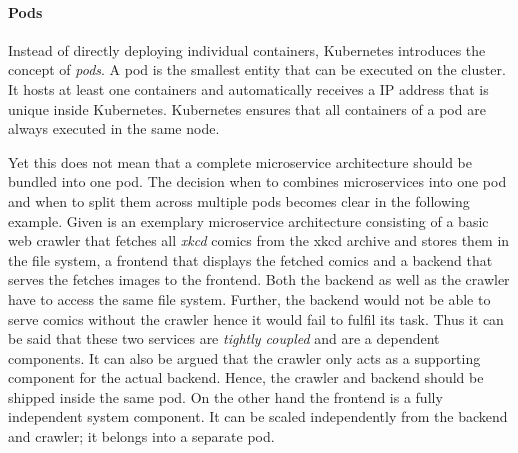 \paragraph{Pods}%
\label{par:Pods}
Instead of directly deploying individual containers, Kubernetes introduces the
concept of \textit{pods}. A pod is the smallest entity that can be executed on
the cluster. It hosts at least one containers and automatically receives a
\ac{IP} address that is unique inside Kubernetes. Kubernetes ensures that all
containers of a pod are always executed in the same node.

Yet this does not mean that a complete microservice architecture should be
bundled into one pod.  The decision when to combines microservices into one pod
and when to split them across multiple pods becomes clear in the following
example. Given is an exemplary microservice architecture consisting of a basic
web crawler that fetches all \textit{xkcd} comics from the xkcd archive and
stores them in the file system, a frontend that displays the fetched comics and
a backend that serves the fetches images to the frontend. Both the backend as
well as the crawler have to access the same file system. Further, the backend
would not be able to serve comics without the crawler hence it would fail to
fulfil its task. Thus it can be said that these two services are
\textit{tightly coupled} and are a dependent components. It can also be argued
that the crawler only acts as a supporting component for the actual backend.
Hence, the crawler and backend should be shipped inside the same pod. On the
other hand the frontend is a fully independent system component. It can be
scaled independently from the backend and crawler; it belongs into a separate
pod.

